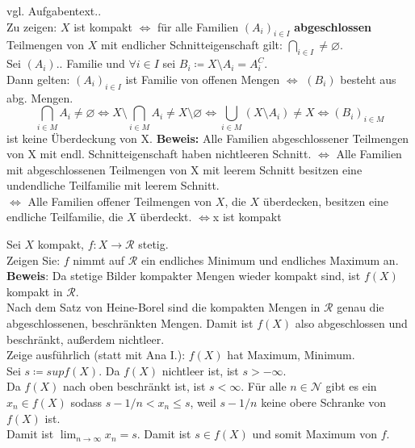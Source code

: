 \begin{problem*}[2]	
vgl. Aufgabentext.. \\
Zu zeigen: $ X $ ist kompakt $ \Longleftrightarrow$ für alle Familien $(A_i)_{ i \in I}$ \textbf{abgeschlossen}
Teilmengen von $ X $ mit endlicher Schnitteigenschaft gilt: $ \bigcap_{ i \in I}  \neq \varnothing$.\\
Sei $ (A_i)..$ Familie und $\forall i \in I$ sei $B_i \coloneqq X \setminus A_i = A_i^{C}$.\\
Dann gelten: 
	$(A_i)_ { i \in I}$ ist Familie von offenen Mengen $\Longleftrightarrow$ $(B_i)$ besteht aus abg. Mengen.
	\begin{equation*}
		\bigcap_{ i \in M} A_i \neq \varnothing \Leftrightarrow X \setminus \bigcap_{ i \in M} A_i \neq	X \setminus \varnothing \Leftrightarrow \bigcup_ {i \in M} (X \setminus A_i) \neq X \Longleftrightarrow (B_i)_{ i \in M }  
	\end{equation*}
	ist keine Überdeckung von X.
	\textbf{Beweis: } Alle Familien abgeschlossener Teilmengen von X mit endl. Schnitteigenschaft haben nichtleeren Schnitt. $\Leftrightarrow$ Alle Familien mit abgeschlossenen Teilmengen von X mit leerem Schnitt besitzen eine undendliche Teilfamilie mit leerem Schnitt. \\
	$\Leftrightarrow$ Alle Familien offener Teilmengen von $ X $, die $ X $ überdecken, besitzen eine endliche Teilfamilie, die $ X $ überdeckt. $\Longleftrightarrow $x ist kompakt
\end{problem*}

\begin{problem*}[3]
Sei $ X $ kompakt, $ f: X \to \mathcal{R}$ stetig.\\
Zeigen Sie: $ f $ nimmt auf $ \mathcal{R} $ ein endliches Minimum und endliches Maximum an.\\
\textbf{Beweis}: Da stetige Bilder kompakter Mengen wieder kompakt sind, ist $f(X)$ kompakt in $\mathcal{R}$.\\
Nach dem Satz von Heine-Borel sind die kompakten Mengen in $\mathcal{R}$ genau die abgeschlossenen, beschränkten Mengen. Damit ist $ f(X) $ also abgeschlossen und beschränkt, außerdem nichtleer.\\
Zeige ausführlich (statt mit Ana I.): $ f(X) $ hat Maximum, Minimum.\\
Sei $ s \coloneqq sup f(X)$. Da $ f(X) $ nichtleer ist, ist $ s > - \infty$.\\
Da $ f(X) $ nach oben beschränkt  ist, ist $ s < \infty$.
Für alle $n \in \mathcal{N}$ gibt es ein $x_n \in f(X)$ sodass $s - 1/n < x_n \leq s$, weil $s - 1/n$ keine obere Schranke von $ f(X) $ ist.\\
Damit ist $\lim_{ n \rightarrow \infty } x_n = s$. Damit ist $s \in f(X) $ und somit Maximum von $ f $.\\
\end{problem*}

